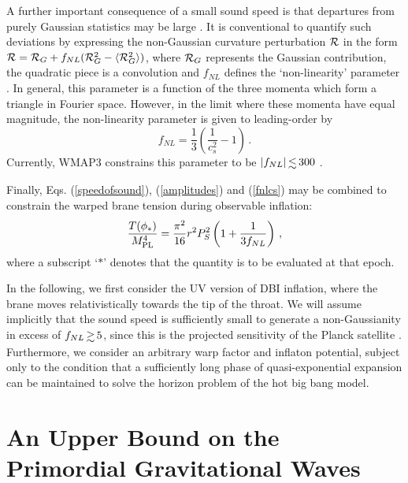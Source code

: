 A further important consequence of a small sound speed is that departures  
from purely Gaussian statistics may be large 
\cite{brane6,brane11,lidser3,chenetal}. It is conventional 
to quantify such deviations by expressing the non-Gaussian curvature 
perturbation ${\cal{R}}$ in the form 
${\cal{R}} ={\cal{R}}_G+f_{NL}
({\cal{R}}^2_G -\langle {\cal{R}}^2_G \rangle)$, where 
${\cal{R}}_G$ represents the Gaussian contribution, 
the quadratic piece is a convolution and $f_{NL}$ defines 
the `non-linearity' parameter \cite{maldacena}. 
In general, this parameter is a function of the three momenta which 
form a triangle in Fourier space. However, in the limit where 
these momenta have equal magnitude, the non-linearity parameter 
is given to leading-order by \cite{chenetal,lidser2}  
\begin{equation}
\label{fnlcs}
f_{NL} = \frac{1}{3} \left( \frac{1}{c_s^2} -1 \right) \,.
\end{equation}
Currently, WMAP3 constrains this parameter  
to be ${| f_{NL} |} \, {\lsim} \, {300}$ \cite{spergel,crim}.  

Finally, Eqs. (\ref{speedofsound}), (\ref{amplitudes}) and (\ref{fnlcs}) 
may be combined to constrain the warped brane tension 
during observable inflation: 
\begin{equation}
\label{observewarp}
\frac{T (\phi_*)}{M_{\mathrm{PL}}^4}  = 
\frac{\pi^2}{16} r^2P_S^2 \left( 1+\frac{1}{3f_{NL}} \right) \,,
\end{equation}
where a subscript `$*$' denotes that the quantity is to be evaluated 
at that epoch. 

In the following, we first consider the UV version of DBI inflation,
where the brane moves relativistically 
towards the tip of the throat. We will assume implicitly 
that the sound speed is sufficiently small to generate a non-Gaussianity in 
excess of $f_{NL} \, {\gsim} \, 5$, since this is the projected 
sensitivity of the Planck satellite \cite{planck}. Furthermore, we consider   
an arbitrary warp factor and inflaton potential, 
subject only to the condition that a sufficiently long phase of 
quasi-exponential expansion can be maintained to solve the horizon problem of
the hot big bang model. 
% 
% 
% 
% 
\section{An Upper Bound on the Primordial Gravitational Waves}
% 
\label{sec:upper}
%

